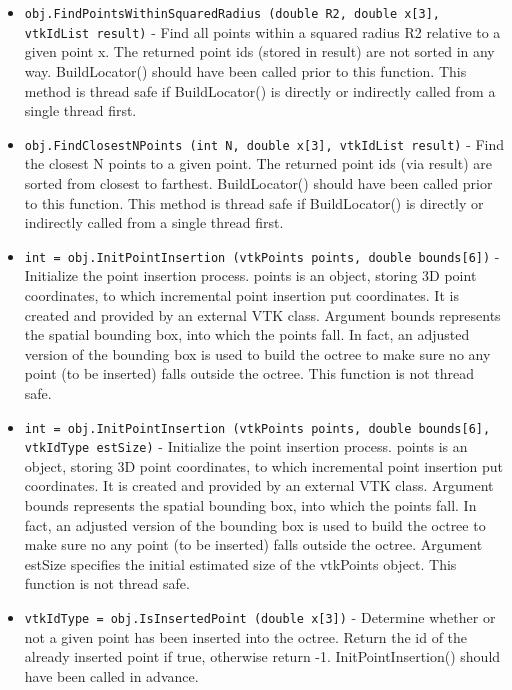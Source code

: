 \begin{itemize}
\item  \verb|obj.FindPointsWithinSquaredRadius (double R2, double x[3], vtkIdList result)| -  Find all points within a squared radius R2 relative to a given point x. The
 returned point ids (stored in result) are not sorted in any way. BuildLocator()
 should have been called prior to this function. This method is thread safe if 
 BuildLocator() is directly or indirectly called from a single thread first.

\item  \verb|obj.FindClosestNPoints (int N, double x[3], vtkIdList result)| -  Find the closest N points to a given point. The returned point ids (via 
 result) are sorted from closest to farthest. BuildLocator() should have 
 been called prior to this function. This method is thread safe if 
 BuildLocator() is directly or indirectly called from a single thread first.

\item  \verb|int = obj.InitPointInsertion (vtkPoints points, double bounds[6])| -  Initialize the point insertion process. points is an object, storing 3D
 point coordinates, to which incremental point insertion put coordinates.
 It is created and provided by an external VTK class. Argument bounds
 represents the spatial bounding box, into which the points fall. In fact, 
 an adjusted version of the bounding box is used to build the octree to 
 make sure no any point (to be inserted) falls outside the octree. This
 function is not thread safe.

\item  \verb|int = obj.InitPointInsertion (vtkPoints points, double bounds[6], vtkIdType estSize)| -  Initialize the point insertion process. points is an object, storing 3D
 point coordinates, to which incremental point insertion put coordinates.
 It is created and provided by an external VTK class. Argument bounds
 represents the spatial bounding box, into which the points fall. In fact, 
 an adjusted version of the bounding box is used to build the octree to 
 make sure no any point (to be inserted) falls outside the octree. Argument
 estSize specifies the initial estimated size of the vtkPoints object. This
 function is not thread safe.

\item  \verb|vtkIdType = obj.IsInsertedPoint (double x[3])| -  Determine whether or not a given point has been inserted into the octree.
 Return the id of the already inserted point if true, otherwise return -1.
 InitPointInsertion() should have been called in advance.


\end{itemize}
